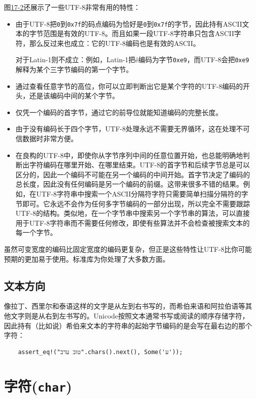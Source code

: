 图\hyperref[f17-2]{17-2}还展示了一些UTF-8非常有用的特性：
\begin{itemize}
    \item 由于UTF-8把\texttt{0}到\texttt{0x7f}的码点编码为恰好是\texttt{0}到\texttt{0x7f}的字节，因此持有ASCII文本的字节范围是有效的UTF-8。而且如果一段UTF-8字符串只包含ASCII字符，那么反过来也成立：它的UTF-8编码也是有效的ASCII。

    对于Latin-1则不成立：例如，Latin-1把é编码为字节\texttt{0xe9}，而UTF-8会把\texttt{0xe9}解释为某个三字节编码的第一个字节。
    \item 通过查看任意字节的高位，你可以立即判断出它是某个字符的UTF-8编码的开头，还是该编码中间的某个字节。
    \item 仅凭一个编码的首字节，通过它的前导位就能知道编码的完整长度。
    \item 由于没有编码长于四个字节，UTF-8处理永远不需要无界循环，这在处理不可信数据时非常方便。
    \item 在良构的UTF-8中，即使你从字节序列中间的任意位置开始，也总能明确地判断出字符编码在哪里开始、在哪里结束。UTF-8的首字节和后续字节总是可以区分的，因此一个编码不可能在另一个编码的中间开始。首字节决定了编码的总长度，因此没有任何编码是另一个编码的前缀。这带来很多不错的结果。例如，在UTF-8字符串中搜索一个ASCII分隔符字符只需要简单扫描分隔符的字节即可。它永远不会作为任何多字节编码的一部分出现，所以完全不需要跟踪UTF-8的结构。类似地，在一个字节串中搜索另一个字节串的算法，可以直接用于UTF-8字符串而不需要任何修改，即使有些算法并不会检查被搜索文本的每一个字节。
\end{itemize}

虽然可变宽度的编码比固定宽度的编码更复杂，但正是这些特性让UTF-8比你可能预期的更加易于使用。标准库为你处理了大多数方面。

\subsection{文本方向}

像拉丁、西里尔和泰语这样的文字是从左到右书写的，而希伯来语和阿拉伯语等其他文字则是从右到左书写的。Unicode按照文本通常书写或阅读的顺序存储字符，因此持有（比如说）希伯来文本的字符串的起始字节编码的是会写在最右边的那个字符：
\begin{verbatim}
    assert_eq!("טוב ערב".chars().next(), Some('ע'));
\end{verbatim}
\section{字符(\texttt{char})}

